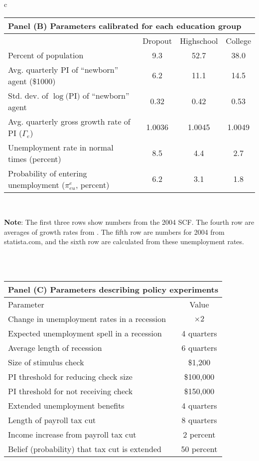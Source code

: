 \documentclass[\econtexRoot/HAFiscal]{subfiles}
\begin{document}
{\begin{table}[p]
\begin{tabular}{c}
        \begin{tabular}{lccc}
          \toprule 
          \multicolumn{4}{l}{Panel (B) Parameters calibrated for each education group} \\ \midrule
          & Dropout & Highschool & College \\ \midrule
          Percent of population & \phantom{0}9.3 & 52.7 & 38.0 \\ 
          Avg. quarterly PI of ``newborn'' agent (\$1000) & \phantom{0}6.2 & 11.1 & 14.5 \\
          Std. dev. of $\log($PI$)$ of ``newborn'' agent & 0.32 & 0.42 & 0.53 \\
          Avg. quarterly gross growth rate of PI ($\Gamma_e$) & 1.0036 & 1.0045 & 1.0049 \\
          Unemployment rate in normal times (percent) & \phantom{0}8.5 & \phantom{0}4.4 & \phantom{0}2.7 \\ 
          Probability of entering unemployment ($\pi_{eu}^{e}$, percent) & \phantom{0}6.2 & \phantom{0}3.1 & \phantom{0}1.8 
          \\ \bottomrule 
        \end{tabular} \\
        \ifdefined\HCode
        \fi
        \parbox{16cm}{\footnotesize \vspace{.25cm} \textbf{Note}: The first three rows show numbers from the 2004 SCF. The fourth row are averages of growth rates from \cite{carroll2020modeling}. The fifth row are numbers for 2004 from statista.com, and the sixth row are calculated from these unemployment rates.\normalsize}
        \\ \\

        \begin{tabular}{lc}
          \toprule 
          \multicolumn{2}{l}{Panel (C) Parameters describing policy experiments} \\ \midrule 
          Parameter & Value \\ \midrule 
          Change in unemployment rates in a recession & $\times 2$ \\ 
          Expected unemployment spell in a recession & 4 quarters \\ 
          Average length of recession & 6 quarters \\ 
          Size of stimulus check & \$1,200 \\ 
          PI threshold for reducing check size & \$100,000 \\ 
          PI threshold for not receiving check & \$150,000 \\ 
          Extended unemployment benefits & 4 quarters \\
          Length of payroll tax cut & 8 quarters \\ 
          Income increase from payroll tax cut & 2 percent \\ 
          Belief (probability) that tax cut is extended & 50 percent 		
          \\ \bottomrule
        \end{tabular} 


\end{tabular}
\end{table}}
\end{document}
